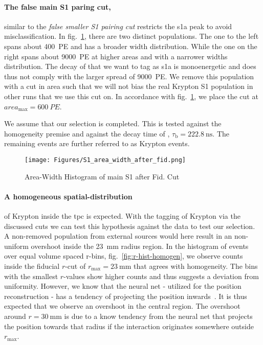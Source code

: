 \paragraph{The false main S1 paring cut,} similar to the \emph{false smaller S1 pairing cut} restricts the \gls{s1a} peak to avoid misclassification.
In fig.~\ref{fig:main_s1_area_width}, there are two distinct populations.
The one to the left spans about \SI{400}{PE} and has a broader width distribution.
While the one on the right spans about \SI{9000}{PE} at higher areas and with a narrower widths distribution.
The decay of  that we want to tag as \gls{s1a} is monoenergetic and does thus not comply with the larger spread of \SI{9000}{PE}.
We remove this population with a cut in area such that we will not bias the real Krypton S1 population in other runs that we use this cut on.
In accordance with fig.~\ref{fig:main_s1_area_width}, we place the cut at $ area_\mathrm{max} = \SI{600}{PE}$.

We assume that our selection is completed.
This is tested against the homogeneity premise and against the decay time of , $\tau_\mathrm{b} = \SI{222.8}{\nano\s}$.
The remaining events are further referred to as Krypton events.


\begin{figure}
\centering
\texttt{[image: Figures/S1\_area\_width\_after\_fid.png]}  %
\caption[Area-Width Histogram of main S1 after Fid. Cut]{
        Area-Width Histogram of main S1 after Fid. Cut
    }
\label{fig:main_s1_area_width}
\end{figure}


\paragraph{A homogeneous spatial-distribution} of Krypton inside the \gls{tpc} is expected.
With the tagging of Krypton via the discussed cuts we can test this hypothesis against the data to test our selection.
A non-removed population from external sources would here result in an non-uniform overshoot inside the \SI{23}{\milli\meter} radius region.
In the histogram of events over equal volume spaced r-bins, fig.~\ref{fig:r-hist-homogen}, we observe counts inside the fiducial $ r $-cut of $r_\mathrm{max} = \SI{23}{\milli\m}$ that agrees with homogeneity.
The bins with the smallest $ r $-values show higher counts and thus suggests a deviation from uniformity.
However, we know that the neural net - utilized for the position reconstruction - has a tendency of projecting the position inwards~\cite{ABism}.
It is thus expected that we observe an overshoot in the central region.
The overshoot around $ r = \SI{30}{\milli\m} $ is due to a know tendency from the neural net that projects the position towards that radius if the interaction originates somewhere outside $ r_\mathrm{max} $.

